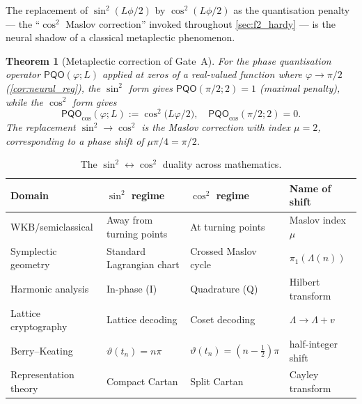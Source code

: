 \documentclass[11pt, a4paper]{article}
\theoremstyle{definition}
\theoremstyle{plain}
\newtheorem{theorem}{Theorem}[section]
\newcommand{\PQO}{\mathsf{PQO}}
\begin{document}
The replacement of $\sin^2(L\phi/2)$ by $\cos^2(L\phi/2)$ as the
quantisation penalty — the ``$\cos^2$ Maslov correction'' invoked
throughout \cref{sec:f2_hardy} — is the neural shadow of a
classical metaplectic phenomenon.

\begin{theorem}[Metaplectic correction of Gate~A]
\label{thm:maslov}
For the phase quantisation operator $\PQO(\varphi; L)$ applied at
zeros of a real-valued function where $\varphi\to\pi/2$
(\cref{cor:neural_reg}), the $\sin^2$ form gives
$\PQO(\pi/2; 2) = 1$ (maximal penalty), while the $\cos^2$ form
gives
\begin{equation}\label{eq:pqo_cos_maslov}
  \PQO_{\cos}(\varphi; L) := \cos^2\!\bigl(L\varphi/2\bigr),
  \quad \PQO_{\cos}(\pi/2; 2) = 0.
\end{equation}
The replacement $\sin^2\to\cos^2$ is the \emph{Maslov correction}
with index $\mu=2$, corresponding to a phase shift of
$\mu\pi/4=\pi/2$.
\end{theorem}

\begin{table}[ht]
\centering
\caption{The $\sin^2\leftrightarrow\cos^2$ duality across mathematics.}
\label{tab:maslov_duality}
\small
\begin{tabular}{@{}p{3cm}|p{3.8cm}|p{3.8cm}|p{3cm}@{}}
\toprule
\textbf{Domain} & \textbf{$\sin^2$ regime} &
\textbf{$\cos^2$ regime} & \textbf{Name of shift} \\
\midrule
WKB/semiclassical       & Away from turning points
                        & At turning points
                        & Maslov index $\mu$ \\
Symplectic geometry     & Standard Lagrangian chart
                        & Crossed Maslov cycle
                        & $\pi_1(\Lambda(n))$ \\
Harmonic analysis       & In-phase (I)
                        & Quadrature (Q)
                        & Hilbert transform \\
Lattice cryptography    & Lattice decoding
                        & Coset decoding
                        & $\Lambda\to\Lambda+v$ \\
Berry--Keating          & $\vartheta(t_n)=n\pi$
                        & $\vartheta(t_n)=(n-\tfrac12)\pi$
                        & half-integer shift \\
Representation theory   & Compact Cartan
                        & Split Cartan
                        & Cayley transform \\
\bottomrule
\end{tabular}
\end{table}
\end{document}

